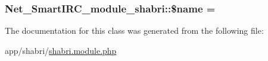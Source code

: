 \subsubsection[{\texorpdfstring{\$name}{$name}}]{\setlength{\rightskip}{0pt plus 5cm}Net\+\_\+\+Smart\+I\+R\+C\+\_\+module\+\_\+shabri\+::\$name = \textquotesingle{}\textquotesingle{}}\hypertarget{classNet__SmartIRC__module__shabri_a03db7b1894653334db45217284781a32}{}\label{classNet__SmartIRC__module__shabri_a03db7b1894653334db45217284781a32}


The documentation for this class was generated from the following file\+:\begin{DoxyCompactItemize}
\item 
app/shabri/\hyperlink{shabri_8module_8php}{shabri.\+module.\+php}\end{DoxyCompactItemize}
